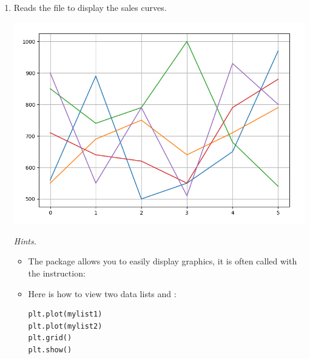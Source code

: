 \documentclass[11pt,class=report,crop=false]{standalone}
\begin{document}
\begin{activite}
\begin{enumerate}
  \item Reads the file  to display the sales curves.
  \begin{center}
\includegraphics[scale=\myscale,scale=0.4]{screen-files-2c-en}
\end{center}  

  \emph{Hints.} 
  \begin{itemize}
    	\item The  package allows you to easily display graphics, it is often called with the instruction:  	
   
   \item Here is how to view two data lists  and :
\begin{center}
\begin{minipage}{0.4\textwidth}
\begin{lstlisting}
plt.plot(mylist1)
plt.plot(mylist2)
plt.grid()
plt.show()
\end{lstlisting}
\end{minipage}
\end{center}


   \end{itemize}
\end{enumerate}   
     
\end{activite}

\end{document}
